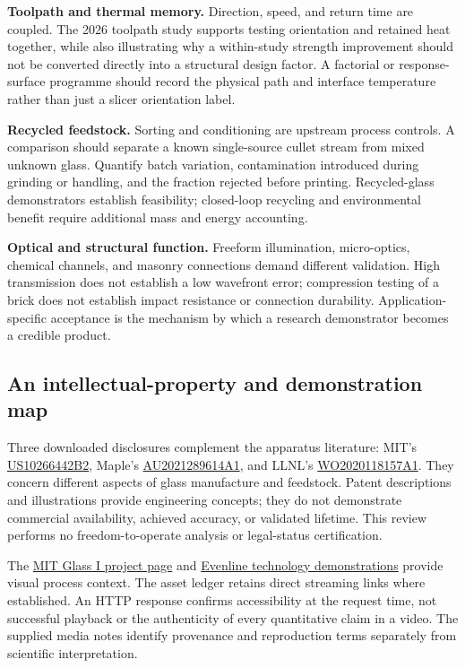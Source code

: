 \textbf{Toolpath and thermal memory.} Direction, speed, and return time are coupled. The 2026 toolpath study supports testing orientation and retained heat together, while also illustrating why a within-study strength improvement should not be converted directly into a structural design factor. A factorial or response-surface programme should record the physical path and interface temperature rather than just a slicer orientation label.\cite{acad_chhadeh2026}

\textbf{Recycled feedstock.} Sorting and conditioning are upstream process controls. A comparison should separate a known single-source cullet stream from mixed unknown glass. Quantify batch variation, contamination introduced during grinding or handling, and the fraction rejected before printing. Recycled-glass demonstrators establish feasibility; closed-loop recycling and environmental benefit require additional mass and energy accounting.\cite{acad_stern2024}

\textbf{Optical and structural function.} Freeform illumination, micro-optics, chemical channels, and masonry connections demand different validation. High transmission does not establish a low wavefront error; compression testing of a brick does not establish impact resistance or connection durability. Application-specific acceptance is the mechanism by which a research demonstrator becomes a credible product.

\subsection{An intellectual-property and demonstration map}
Three downloaded disclosures complement the apparatus literature: MIT's \href{https://patents.google.com/patent/US10266442B2/en}{US10266442B2}, Maple's \href{https://patents.google.com/patent/AU2021289614A1/en}{AU2021289614A1}, and LLNL's \href{https://patents.google.com/patent/WO2020118157A1/en}{WO2020118157A1}. They concern different aspects of glass manufacture and feedstock. Patent descriptions and illustrations provide engineering concepts; they do not demonstrate commercial availability, achieved accuracy, or validated lifetime. This review performs no freedom-to-operate analysis or legal-status certification.

The \href{https://www.media.mit.edu/projects/g3p/overview/}{MIT Glass I project page} and \href{https://www.evenline.co/technology}{Evenline technology demonstrations} provide visual process context. The asset ledger retains direct streaming links where established. An HTTP response confirms accessibility at the request time, not successful playback or the authenticity of every quantitative claim in a video. The supplied media notes identify provenance and reproduction terms separately from scientific interpretation.

